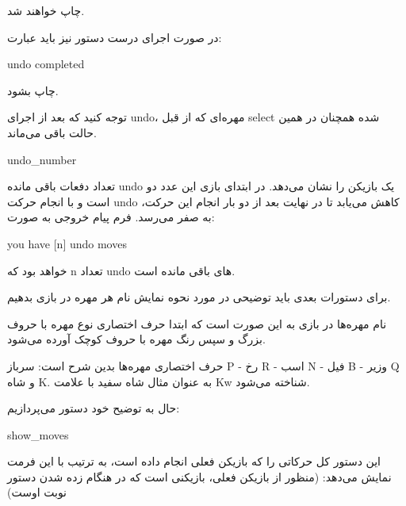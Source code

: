 \documentclass[]{article}
\begin{document}
چاپ خواهند شد.

در صورت اجرای درست دستور نیز باید عبارت:


\begin{tcolorbox}[boxrule=0pt]
	\begin{latin}
  	  \large{
  	  	undo completed
		}
	\end{latin}
\end{tcolorbox}

چاپ بشود.

توجه کنید که بعد از اجرای undo، مهره‌ای که از قبل select شده همچنان در همین حالت باقی می‌ماند.


\hrulefill


\begin{tcolorbox}[boxrule=0pt]
	\begin{latin}
  	  \large{
  	  	undo\_number
		}
	\end{latin}
\end{tcolorbox}

تعداد دفعات باقی مانده undo یک بازیکن را نشان می‌دهد. در ابتدای بازی این عدد دو است و با انجام حرکت undo کاهش می‌یابد تا در نهایت بعد از دو بار انجام این حرکت، به صفر می‌رسد. فرم پیام خروجی به صورت:


\begin{tcolorbox}[boxrule=0pt]
	\begin{latin}
  	  \large{
  	  	you have [n] undo moves
		}
	\end{latin}
\end{tcolorbox}

خواهد بود که n تعداد undo های باقی مانده است.

\hrulefill

برای دستورات بعدی باید توضیحی در مورد نحوه نمایش نام هر مهره در بازی بدهیم.

نام مهره‌ها در بازی به این صورت است که ابتدا حرف اختصاری نوع مهره با حروف بزرگ و سپس رنگ مهره با حروف کوچک آورده می‌شود.

حرف اختصاری مهره‌ها بدین شرح است: سرباز P - رخ R - اسب N - فیل B - وزیر Q و شاه K. به عنوان مثال شاه سفید با علامت Kw شناخته می‌شود.

حال به توضیح خود دستور می‌پردازیم:


\begin{tcolorbox}[boxrule=0pt]
	\begin{latin}
  	  \large{
  	  	show\_moves
		}
	\end{latin}
\end{tcolorbox}

این دستور کل حرکاتی را که بازیکن فعلی انجام داده است، به ترتیب با این فرمت نمایش می‌دهد: (منظور از بازیکن فعلی، بازیکنی است که در هنگام زده شدن دستور نوبت اوست)
\end{document}
